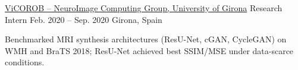 \begin{cventries}
\cventry
    {\href{https://vicorob.udg.edu}{ViCOROB -- NeuroImage Computing Group, University of Girona}} %
    {Research Intern} %
    {Feb. 2020 -- Sep. 2020} %
    {Girona, Spain} %
    {
      \begin{cvitems}
        \item {Benchmarked MRI synthesis architectures (ResU-Net, cGAN, CycleGAN) on WMH and BraTS 2018; ResU-Net achieved best SSIM/MSE under data-scarce conditions.}
      \end{cvitems}
    }

\end{cventries}

